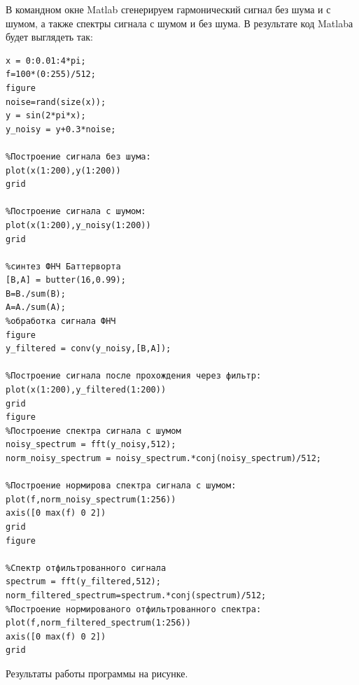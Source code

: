 \documentclass[10pt,a4paper]{article}
\begin{document}
 В командном окне Matlab сгенерируем гармонический сигнал без шума и с шумом, а также спектры сигнала с шумом и без шума. В результате код Matlabа будет выглядеть так:
\begin{verbatim}
x = 0:0.01:4*pi;
f=100*(0:255)/512;
figure
noise=rand(size(x));
y = sin(2*pi*x);
y_noisy = y+0.3*noise;

%Построение сигнала без шума:
plot(x(1:200),y(1:200))
grid

%Построение сигнала с шумом:
plot(x(1:200),y_noisy(1:200))
grid

%синтез ФНЧ Баттерворта
[B,A] = butter(16,0.99);
B=B./sum(B);
A=A./sum(A);
%обработка сигнала ФНЧ
figure
y_filtered = conv(y_noisy,[B,A]);

%Построение сигнала после прохождения через фильтр:
plot(x(1:200),y_filtered(1:200))
grid
figure
%Построение спектра сигнала с шумом
noisy_spectrum = fft(y_noisy,512);
norm_noisy_spectrum = noisy_spectrum.*conj(noisy_spectrum)/512;

%Построение нормирова спектра сигнала с шумом:
plot(f,norm_noisy_spectrum(1:256))
axis([0 max(f) 0 2])
grid
figure

%Спектр отфильтрованного сигнала
spectrum = fft(y_filtered,512);
norm_filtered_spectrum=spectrum.*conj(spectrum)/512;
%Построение нормированого отфильтрованного спектра:
plot(f,norm_filtered_spectrum(1:256))
axis([0 max(f) 0 2])
grid
\end{verbatim}
Результаты работы программы на рисунке.
\end{document}
